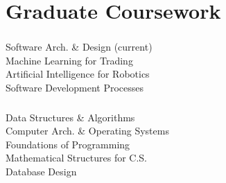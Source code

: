 %
%
%
%
\section{Graduate Coursework}
  \subsubsection{\SchoolAinit}
      {\small
      Software Arch. \& Design (current)\\
      Machine Learning for Trading\\
      Artificial Intelligence for Robotics\\
      Software Development Processes\\
      }
%
%
  {\vspace{-0.5em}}
%
%
  \subsubsection{\SchoolBinit}
      {\small
      Data Structures \& Algorithms\\
      Computer Arch. \& Operating Systems\\
      Foundations of Programming\\
      Mathematical Structures for C.S.\\
      Database Design\\
      }
%
%
%
{\vspace{1.3em}}
\profiles%
      {\web\Web}%
      {\github\Github}%
      {\linkedin\Linkedin}%